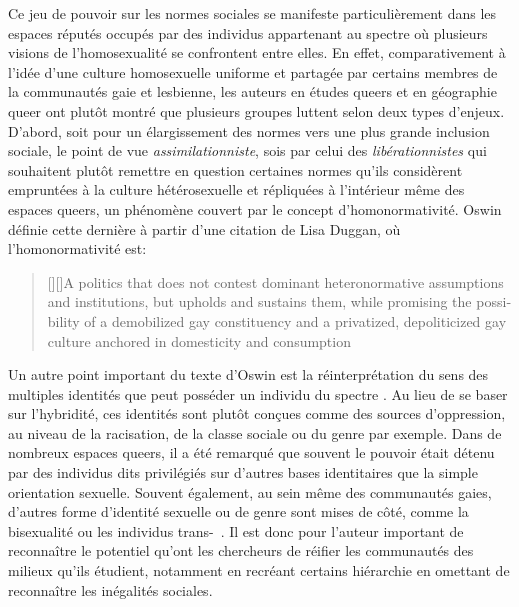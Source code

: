 Ce jeu de pouvoir sur les normes sociales se manifeste particulièrement dans les espaces réputés occupés par des individus appartenant au spectre \lgbt{} où plusieurs visions de l'homosexualité se confrontent entre elles. 
En effet, comparativement à l'idée d'une culture homosexuelle uniforme et partagée par certains membres de la communautés gaie et lesbienne, les auteurs en études queers et en géographie queer ont plutôt montré que plusieurs groupes luttent selon deux types d'enjeux.
D'abord, soit pour un élargissement des normes vers une plus grande inclusion sociale, le point de vue \emph{assimilationniste}, sois par celui des \emph{libérationnistes} qui souhaitent plutôt remettre en question certaines normes qu'ils considèrent empruntées à la culture hétérosexuelle et répliquées à l'intérieur même des espaces queers, un phénomène couvert par le concept d'homonormativité. 
Oswin définie cette dernière à partir d'une citation de Lisa Duggan, où l'homonormativité est: 
\foreignblockquote{english}[{\cite[tel que cité dans][92]{Oswin2008}}][]{[{\cite[50]{Duggan2003}}][]{A politics that does not contest dominant heteronormative assumptions and institutions, but upholds and sustains them, while promising the possibility of a demobilized gay constituency and a privatized, depoliticized gay culture anchored in domesticity and consumption}}.

Un autre point important du texte d'Oswin est la réinterprétation du sens des multiples identités que peut posséder un individu du spectre \lgbt{}. 
Au lieu de se baser sur l'hybridité, ces identités sont plutôt conçues comme des sources d'oppression, au niveau de la racisation, de la classe sociale ou du genre par exemple. 
Dans de nombreux espaces queers, il a été remarqué que souvent le pouvoir était détenu par des individus dits privilégiés sur d'autres bases identitaires que la simple orientation sexuelle. 
Souvent également, au sein même des communautés gaies, d'autres forme d'identité sexuelle ou de genre sont mises de côté, comme la bisexualité ou les individus trans-~\citep[93]{Oswin2008}.
Il est donc pour l'auteur important de reconnaître le potentiel qu'ont les chercheurs de réifier les communautés des milieux qu'ils étudient, notamment en recréant certains hiérarchie en omettant de reconnaître les inégalités sociales.


